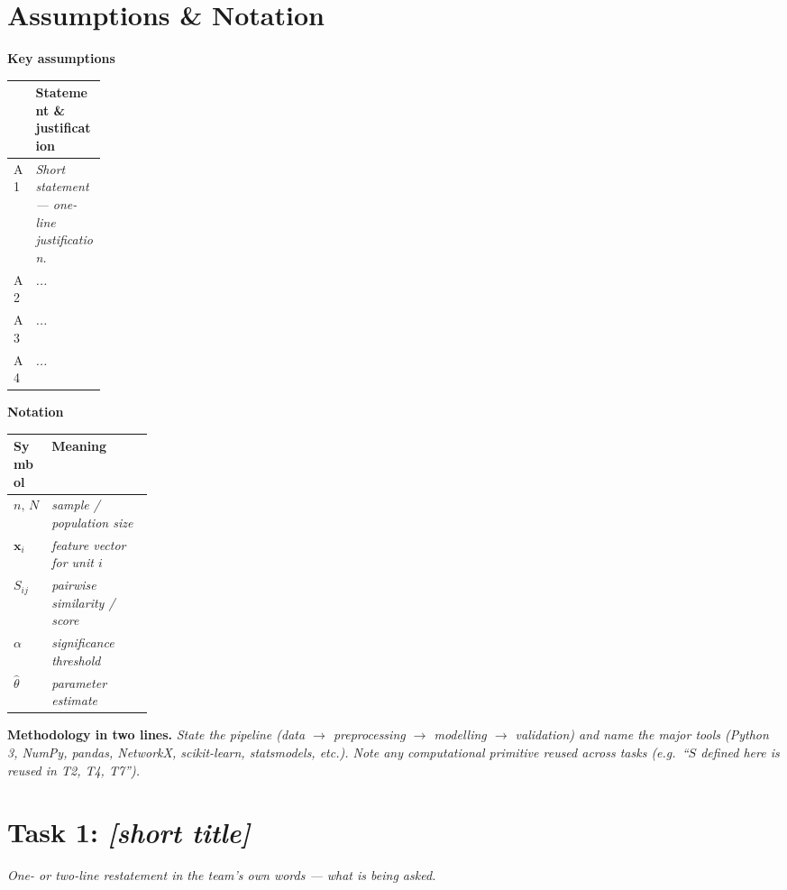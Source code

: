 \documentclass[12pt,a4paper]{article}
\newcommand{\ph}[1]{\textit{\textcolor{phgray}{#1}}}
\begin{document}
\section{Assumptions \& Notation}
\noindent
\begin{minipage}[t]{0.48\linewidth}
\textbf{Key assumptions} \\[2pt]
\begin{tabularx}{\linewidth}{@{}p{0.12\linewidth}X@{}}
\toprule
\textbf{} & \textbf{Statement \& justification} \\
\midrule
A1 & \ph{Short statement — one-line justification.} \\
A2 & \ph{...} \\
A3 & \ph{...} \\
A4 & \ph{...} \\
\bottomrule
\end{tabularx}
\end{minipage}\hfill
\begin{minipage}[t]{0.48\linewidth}
\textbf{Notation} \\[2pt]
\begin{tabularx}{\linewidth}{@{}p{0.18\linewidth}X@{}}
\toprule
\textbf{Symbol} & \textbf{Meaning} \\
\midrule
$n,\,N$        & \ph{sample / population size} \\
$\bm{x}_i$     & \ph{feature vector for unit $i$} \\
$S_{ij}$       & \ph{pairwise similarity / score} \\
$\alpha$       & \ph{significance threshold} \\
$\hat{\theta}$ & \ph{parameter estimate} \\
\bottomrule
\end{tabularx}
\end{minipage}

\textbf{Methodology in two lines.} \ph{State the pipeline (data $\to$ preprocessing $\to$ modelling $\to$ validation) and name the major tools (Python 3, NumPy, pandas, NetworkX, scikit-learn, statsmodels, etc.). Note any computational primitive reused across tasks (e.g.\ ``$S$ defined here is reused in T2, T4, T7'').}

\section{Task 1: \ph{[short title]}}
\textit{\ph{One- or two-line restatement in the team's own words — what is being asked.}}
\end{document}
